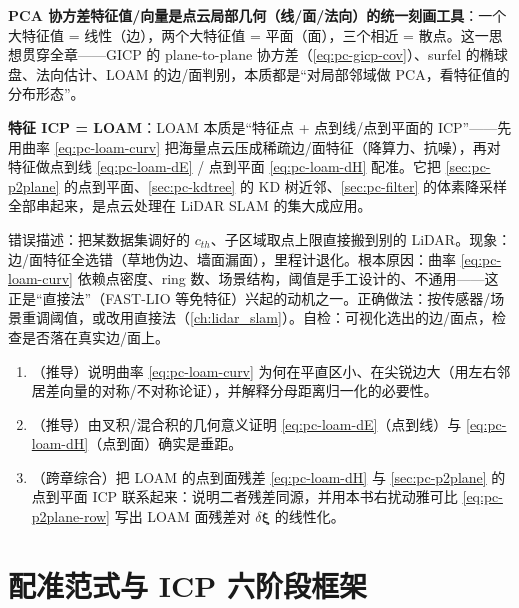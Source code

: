 \begin{insight}
\textbf{PCA 协方差特征值/向量是点云局部几何（线/面/法向）的统一刻画工具}：一个大特征值 = 线性（边），两个大特征值 = 平面（面），三个相近 = 散点。这一思想贯穿全章——GICP 的 plane-to-plane 协方差（\cref{eq:pc-gicp-cov}）、surfel 的椭球盘、法向估计、LOAM 的边/面判别，本质都是“对局部邻域做 PCA，看特征值的分布形态”。
\end{insight}

\begin{insight}
\textbf{特征 ICP = LOAM}：LOAM 本质是“特征点 + 点到线/点到平面的 ICP”——先用曲率 \cref{eq:pc-loam-curv} 把海量点云压成稀疏边/面特征（降算力、抗噪），再对特征做点到线 \cref{eq:pc-loam-dE} / 点到平面 \cref{eq:pc-loam-dH} 配准。它把 \cref{sec:pc-p2plane} 的点到平面、\cref{sec:pc-kdtree} 的 KD 树近邻、\cref{sec:pc-filter} 的体素降采样全部串起来，是点云处理在 LiDAR SLAM 的集大成应用。
\end{insight}

\begin{pitfall}
错误描述：把某数据集调好的 $c_{th}$、子区域取点上限直接搬到别的 LiDAR。现象：边/面特征全选错（草地伪边、墙面漏面），里程计退化。根本原因：曲率 \cref{eq:pc-loam-curv} 依赖点密度、ring 数、场景结构，阈值是手工设计的、不通用——这正是“直接法”（FAST-LIO 等免特征）兴起的动机之一。正确做法：按传感器/场景重调阈值，或改用直接法（\cref{ch:lidar_slam}）。自检：可视化选出的边/面点，检查是否落在真实边/面上。
\end{pitfall}

\begin{practice}
\begin{enumerate}
  \item （推导）说明曲率 \cref{eq:pc-loam-curv} 为何在平直区小、在尖锐边大（用左右邻居差向量的对称/不对称论证），并解释分母距离归一化的必要性。
  \item （推导）由叉积/混合积的几何意义证明 \cref{eq:pc-loam-dE}（点到线）与 \cref{eq:pc-loam-dH}（点到面）确实是垂距。
  \item （跨章综合）把 LOAM 的点到面残差 \cref{eq:pc-loam-dH} 与 \cref{sec:pc-p2plane} 的点到平面 ICP 联系起来：说明二者残差同源，并用本书右扰动雅可比 \cref{eq:pc-p2plane-row} 写出 LOAM 面残差对 $\delta\boldsymbol{\xi}$ 的线性化。
\end{enumerate}
\end{practice}

\section{配准范式与 ICP 六阶段框架}
\label{sec:pc-paradigm}

